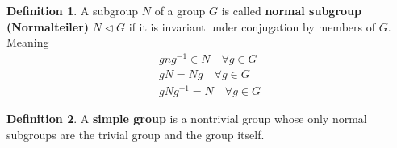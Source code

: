 \documentclass[10pt,a4paper]{article}
\theoremstyle{definition}
\newtheorem{definition}{Definition}[section]
\begin{document}
\begin{definition}{}
A subgroup $N$ of a group $G$ is called {\bf normal subgroup (Normalteiler)} $N\vartriangleleft G$ if it is invariant under conjugation by members of $G$. Meaning
\begin{align}
    gng^{-1}\in N\quad \forall g\in G\\
    gN=Ng  \quad \forall g\in G\\
    gNg^{-1}=N  \quad \forall g\in G
\end{align}
\end{definition}

\begin{definition}{}
A {\bf simple group} is a nontrivial group whose only normal subgroups are the trivial group and the group itself.
\end{definition}
\end{document}
